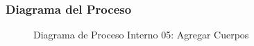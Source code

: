 \subsubsection{Diagrama del Proceso}
\begin{figure}[H]
    \centering
        \caption{Diagrama de Proceso Interno 05: Agregar Cuerpos}%
    \label{fig:process_diagram05}
\end{figure}
\newpage